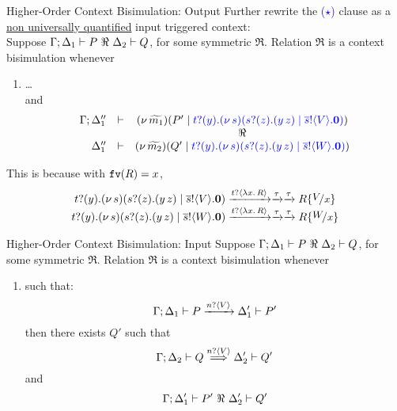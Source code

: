 \documentclass{beamer}
\newcommand{\prcolor}[1]{{\color{blue} #1}}
\begin{document}
	\begin{frame}{Higher-Order Context Bisimulation: Output}
		Further rewrite the \textcolor{blue}{($\star$)} clause as a \underline{non universally quantified} input triggered context:
		\\[2mm]

		Suppose $\Gamma; \Delta_1 \proves P\ \Re\ \Delta_2 \proves Q$, for some symmetric $\Re$. Relation $\Re$ is
		a context bisimulation whenever
		\begin{enumerate}[$(\star)$]
			\item
				\dots\\
				and
				\[
					\begin{array}{rcc}
						\Gamma; \Delta_1'' &\proves& \newsp{\widetilde{m_1}}{P' \Par \prcolor{\binp{t}{y}\newsp{s}{\binp{s}{z} (\appl{y}{z}) \Par \bout{\dual{s}}{V} \inact}}}
						\\
						&& \Re
						\\
						\Delta_1'' &\proves& \newsp{\widetilde{m_2}}{Q' \Par \prcolor{\binp{t}{y}\newsp{s}{\binp{s}{z} (\appl{y}{z}) \Par \bout{\dual{s}}{W} \inact}}}
					\end{array}
				\]
		\end{enumerate}

		This is because  with $\mathtt{fv}(R)=x$, 
		\[
			\begin{array}{c}
				\binp{t}{y}\newsp{s}{\binp{s}{z} (\appl{y}{z}) \Par \bout{\dual{s}}{V} \inact}
				\by{\bactinp{t}{\abs{x}{R}}} \by{\tau} \by{\tau}
				R \subst{V}{x}
				\\
				\binp{t}{y}\newsp{s}{\binp{s}{z} (\appl{y}{z}) \Par \bout{\dual{s}}{W} \inact}
				\by{\bactinp{t}{\abs{x}{R}}} \by{\tau} \by{\tau}
				R \subst{W}{x}
			\end{array}
		\]
	\end{frame}

	\begin{frame}{Higher-Order Context Bisimulation: Input}
		Suppose $\Gamma; \Delta_1 \proves P\ \Re\ \Delta_2 \proves Q$, for some symmetric $\Re$. Relation $\Re$ is
		a context bisimulation whenever
		\begin{enumerate}[$(\bullet)$]
			\item	{} such that:
				\[
					\Gamma; \Delta_1 \vdash P \xrightarrow{n ? \langle V \rangle} \Delta_1' \vdash P'
				\]
				then there exists $Q'$ such that
				\[
					\Gamma; \Delta_2 \vdash Q \stackrel{n ? \langle V \rangle}{\Longrightarrow} \Delta_2' \vdash Q'
				\]
				and
				\[
					\Gamma; \Delta_1' \vdash P'\ \Re\ \Delta_2' \vdash Q'
				\]
		\end{enumerate}
	\end{frame}
\end{document}
